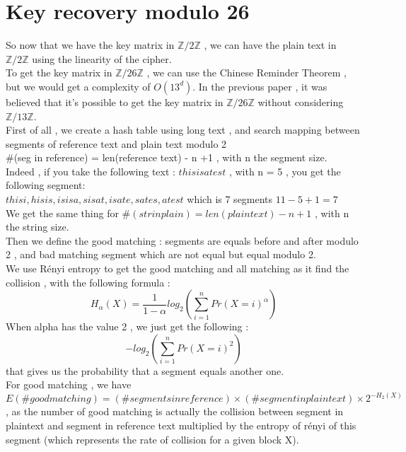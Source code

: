 \documentclass{article}
\begin{document}
\section{Key recovery modulo 26}
So now that we have the key matrix in $\mathbb{Z}/2\mathbb{Z}$ , we can have the plain text in $\mathbb{Z}/2\mathbb{Z}$ using the linearity of the cipher.\\
To get the key matrix in $\mathbb{Z}/26\mathbb{Z}$ , we can use the Chinese Reminder Theorem , but we would get a complexity of $O(13^d)$. In the previous paper , it was believed that it's possible to get the key matrix in $\mathbb{Z}/26\mathbb{Z}$ without considering $\mathbb{Z}/13\mathbb{Z}$.\\
First of all , we create a hash table using long text , and search mapping between segments of reference text and plain text modulo 2\\
\#(seg in reference) = len(reference text) - n +1 , with n the segment size.\\
Indeed , if you take the following text : $thisisatest$ , with n = 5 , you get the following segment:\\
 $ thisi , hisis , isisa , sisat , isate , sates , atest $ which is 7 segments $ 11 - 5 + 1 = 7 $\\
${}$\hspace{1em}We get the same thing for $\#(str in plain) = len(plain text) - n +1$ , with n the string size.\\
Then we define the good matching : segments are equals before and after modulo 2 , and bad matching segment which are not equal but equal modulo 2.\\
We use R\'enyi entropy to get the good matching and all matching as it find the collision , with the following formula :\\
$$H_{\alpha}(X) = \frac{1}{1-\alpha}log_{2}(\sum_{i=1}^{n}{Pr(X=i)^{\alpha}})$$ 
When alpha has the value 2 , we just get the following :
$$-log_{2}(\sum_{i=1}^{n}{Pr(X=i)^{2}})$$ that gives us the probability that a segment equals another one.\\
${}$\hspace{1em}For good matching , we have $E(\# good matching) = (\# segments in reference) \times (\#segment in plaintext) \times 2^{-H_{2}(X)}$ , as the number of good matching is actually the collision between segment in plaintext and segment in reference text multiplied by the entropy of r\'enyi of this segment (which represents the rate of collision for a given block X).\\
\end{document}
